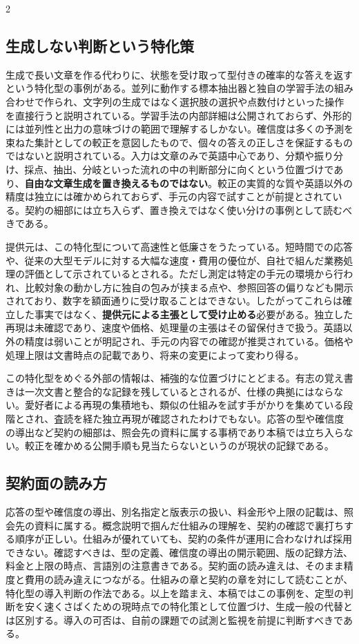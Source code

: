 \documentclass[lualatex,a4paper,10pt]{jlreq}
\begin{document}
\begin{multicols}{2}
\subsection{生成しない判断という特化策}
生成で長い文章を作る代わりに、状態を受け取って型付きの確率的な答えを返すという特化型の事例がある\autocite{sysone,sysoneconcepts}。並列に動作する標本抽出器と独自の学習手法の組み合わせで作られ、文字列の生成ではなく選択肢の選択や点数付けといった操作を直接行うと説明されている。学習手法の内部詳細は公開されておらず、外形的には並列性と出力の意味づけの範囲で理解するしかない。確信度は多くの予測を束ねた集計としての較正を意図したもので、個々の答えの正しさを保証するものではないと説明されている。入力は文章のみで英語中心であり、分類や振り分け、採点、抽出、分岐といった流れの中の判断部分に向くという位置づけであり、\textbf{自由な文章生成を置き換えるものではない}。較正の実質的な質や英語以外の精度は独立には確かめられておらず、手元の内容で試すことが前提とされている。契約の細部には立ち入らず、置き換えではなく使い分けの事例として読むべきである。

提供元は、この特化型について高速性と低廉さをうたっている\autocite{jevmodels}。短時間での応答や、従来の大型モデルに対する大幅な速度・費用の優位が、自社で組んだ業務処理の評価として示されているとされる。ただし測定は特定の手元の環境から行われ、比較対象の動かし方に独自の包みが挟まる点や、参照回答の偏りなども開示されており、数字を額面通りに受け取ることはできない。したがってこれらは確立した事実ではなく、\textbf{提供元による主張として受け止める}必要がある。独立した再現は未確認であり、速度や価格、処理量の主張はその留保付きで扱う。英語以外の精度は弱いことが明記され、手元の内容での確認が推奨されている。価格や処理上限は文書時点の記載であり、将来の変更によって変わり得る。

この特化型をめぐる外部の情報は、補強的な位置づけにとどまる。有志の覚え書きは一次文書と整合的な記録を残しているとされるが、仕様の典拠にはならない\autocite{jevwiki}。愛好者による再現の集積地も、類似の仕組みを試す手がかりを集めている段階とされ、査読を経た独立再現が確認されたわけでもない\autocite{awesomejev}。応答の型や確信度の導出など契約の細部は、照会先の資料に属する事柄であり本稿では立ち入らない\autocite{typesafeapi}。較正を確かめる公開手順も見当たらないというのが現状の記録である。

\subsection{契約面の読み方}
応答の型や確信度の導出、別名指定と版表示の扱い、料金形や上限の記載は、照会先の資料に属する\autocite{typesafeapi}。概念説明で掴んだ仕組みの理解を、契約の確認で裏打ちする順序が正しい。仕組みが優れていても、契約の条件が運用に合わなければ採用できない。確認すべきは、型の定義、確信度の導出の開示範囲、版の記録方法、料金と上限の時点、言語別の注意書きである。契約面の読み違えは、そのまま精度と費用の読み違えにつながる。仕組みの章と契約の章を対にして読むことが、特化型の導入判断の作法である。以上を踏まえ、本稿ではこの事例を、定型の判断を安く速くさばくための現時点での特化策として位置づけ、生成一般の代替とは区別する。導入の可否は、自前の課題での試測と監視を前提に判断すべきである。


\end{multicols}
\end{document}
